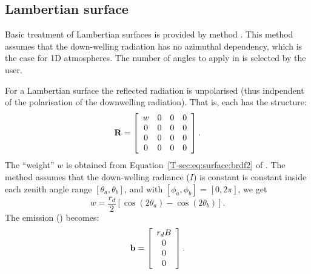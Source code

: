 \subsection{Lambertian surface}
Basic treatment of Lambertian surfaces is provided by method
. This method assumes that the down-welling
radiation has no azimuthal dependency, which is the case for 1D atmospheres.
The number of angles to apply in  is selected by the
user.

For a Lambertian surface the reflected radiation is unpolarised (thus
indpendent of the polarisation of the downwelling radiation). That is,
each  has the structure:
\begin{equation}
  \mathbf{R} =
     \left[\begin{array}{cccc}
       w&0&0&0\\
       0&0&0&0\\
       0&0&0&0\\
       0&0&0&0\\
     \end{array}
     \right].
\end{equation}
The ``weight'' $w$ is obtained from Equation~\ref{T-sec:eq:surface:brdf2} of
\theory. The method  assumes that the
down-welling radiance ($I$) is constant is constant inside each zenith angle
range $[\theta_a,\theta_b]$, and with $[\phi_a,\phi_b]$ = $[0,2\pi]$, we get
\begin{equation}
  w = \frac{r_d}{2}\left[\cos(2\theta_a)-\cos(2\theta_b)\right].
\end{equation}
The emission () becomes:
\begin{equation}
  \label{eq:surface:blambertian} 
  \mathbf{b} =  \left[\begin{array}{c} r_dB \\ 0 \\0\\0 \end{array}\right].
\end{equation}



